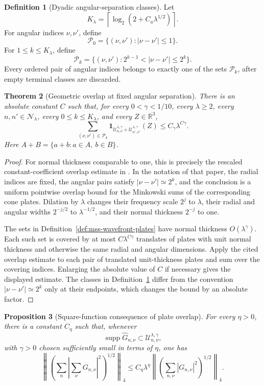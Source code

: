 \documentclass[11pt]{article}
\numberwithin{equation}{section}
\newtheorem{theorem}{Theorem}[section]
\newtheorem{proposition}[theorem]{Proposition}
\theoremstyle{definition}
\newtheorem{definition}[theorem]{Definition}
\theoremstyle{remark}
\newcommand{\R}{\mathbb R}
\newcommand{\supp}{\operatorname{supp}}
\begin{document}
\begin{definition}[Dyadic angular-separation classes]\label{def:mss-angular-separation}
Let
\[
K_\lambda=\left\lceil\log_2(2+C_a\lambda^{1/2})\right\rceil.
\]
For angular indices $\nu,\nu'$, define
\[
\mathcal P_0=\{(\nu,\nu'):|\nu-\nu'|\le1\}.
\]
For $1\le k\le K_\lambda$, define
\[
\mathcal P_k
=\{(\nu,\nu'):2^{k-1}<|\nu-\nu'|\le2^k\}.
\]
Every ordered pair of angular indices belongs to exactly one of the sets
$\mathcal P_k$, after empty terminal classes are discarded.
\end{definition}

\begin{theorem}[Geometric overlap at fixed angular separation]\label{thm:mss-plate-overlap}
There is an absolute constant $C$ such that, for every $0<\gamma<1/10$, every $\lambda\ge2$, every $n,n'\in\mathcal N_\lambda$, every $0\le k\le K_\lambda$, and every $Z\in\R^3$,
\[
\sum_{(\nu,\nu')\in\mathcal P_k}
\mathbf 1_{\mathcal U_{n,\nu}^{\lambda,\gamma}
+\mathcal U_{n',\nu'}^{\lambda,\gamma}}(Z)
\le C_\gamma\lambda^{C\gamma}.
\]
Here $A+B=\{a+b:a\in A,\ b\in B\}$.
\end{theorem}

\begin{proof}
For normal thickness comparable to one, this is precisely the rescaled constant-coefficient overlap estimate in \cite[Lemma~1.3 and Appendix]{MSS1992}.  In the notation of that paper, the radial indices are fixed, the angular pairs satisfy $|\nu-\nu'|\simeq2^k$, and the conclusion is a uniform pointwise overlap bound for the Minkowski sums of the corresponding cone plates.  Dilation by $\lambda$ changes their frequency scale $2^j$ to $\lambda$, their radial and angular widths $2^{-j/2}$ to $\lambda^{-1/2}$, and their normal thickness $2^{-j}$ to one.

The sets in Definition~\ref{def:mss-wavefront-plates} have normal thickness $O(\lambda^\gamma)$.  Each such set is covered by at most $C\lambda^{C\gamma}$ translates of plates with unit normal thickness and otherwise the same radial and angular dimensions.  Apply the cited overlap estimate to each pair of translated unit-thickness plates and sum over the covering indices.  Enlarging the absolute value of $C$ if necessary gives the displayed estimate.  The classes in Definition~\ref{def:mss-angular-separation} differ from the convention $|\nu-\nu'|\simeq2^k$ only at their endpoints, which changes the bound by an absolute factor.
\end{proof}

\begin{proposition}[Square-function consequence of plate overlap]\label{prop:mss-overlap-square-function}
For every $\eta>0$, there is a constant $C_\eta$ such that, whenever
\[
\supp\widehat G_{n,\nu}
\subset\mathcal U_{n,\nu}^{\lambda,\gamma},
\]
with $\gamma>0$ chosen sufficiently small in terms of $\eta$, one has
\[
\left\|\left(\sum_n\left|\sum_\nu G_{n,\nu}\right|^2\right)^{1/2}\right\|_4
\le C_\eta\lambda^\eta
\left\|\left(\sum_{n,\nu}|G_{n,\nu}|^2\right)^{1/2}\right\|_4.
\]
\end{proposition}
\end{document}
